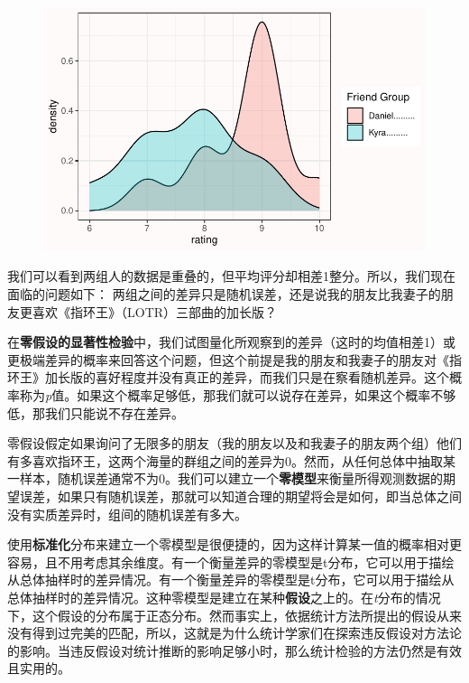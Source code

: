 \documentclass[
  letterpaper,
  DIV=11,
  numbers=noendperiod]{scrreprt}
\begin{document}
\begin{figure}

{\centering \includegraphics[width=1\textwidth,height=\textheight]{01-pvalue_files/figure-pdf/unnamed-chunk-3-1.pdf}

}

\end{figure}

我们可以看到两组人的数据是重叠的，但平均评分却相差1整分。所以，我们现在面临的问题如下：
两组之间的差异只是随机误差，还是说我的朋友比我妻子的朋友更喜欢《指环王》（LOTR）三部曲的加长版？

在\textbf{零假设的显著性检验}中，我们试图量化所观察到的差异（这时的均值相差1）或更极端差异的概率来回答这个问题，但这个前提是我的朋友和我妻子的朋友对《指环王》加长版的喜好程度并没有真正的差异，而我们只是在察看随机差异。这个概率称为\emph{p}值。如果这个概率足够低，那我们就可以说存在差异，如果这个概率不够低，那我们只能说不存在差异。

零假设假定如果询问了无限多的朋友（我的朋友以及和我妻子的朋友两个组）他们有多喜欢指环王，这两个海量的群组之间的差异为0。然而，从任何总体中抽取某一样本，随机误差通常不为0。我们可以建立一个\textbf{零模型}来衡量所得观测数据的期望误差，如果只有随机误差，那就可以知道合理的期望将会是如何，即当总体之间没有实质差异时，组间的随机误差有多大。

使用\textbf{标准化}分布来建立一个零模型是很便捷的，因为这样计算某一值的概率相对更容易，且不用考虑其余维度。有一个衡量差异的零模型是t分布，它可以用于描绘从总体抽样时的差异情况。有一个衡量差异的零模型是t分布，它可以用于描绘从总体抽样时的差异情况。这种零模型是建立在某种\textbf{假设}之上的。在\emph{t}分布的情况下，这个假设的分布属于正态分布。然而事实上，依据统计方法所提出的假设从来没有得到过完美的匹配，所以，这就是为什么统计学家们在探索违反假设对方法论的影响。当违反假设对统计推断的影响足够小时，那么统计检验的方法仍然是有效且实用的。
\end{document}
